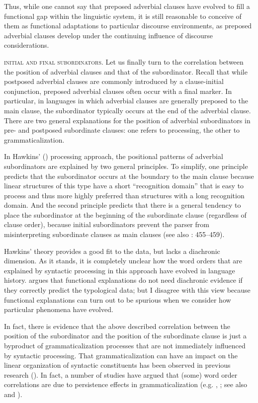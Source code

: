 \documentclass[output=paper]{langsci/langscibook}
\begin{document}
Thus, while one cannot say that preposed adverbial clauses have evolved to fill a functional gap within the linguistic system, it is still reasonable to conceive of them as functional adaptations to particular discourse environments, as preposed adverbial clauses develop under the continuing influence of discourse considerations.

\textsc{initial} \textsc{and} \textsc{final} \textsc{subordinators}. Let us finally turn to the correlation between the position of adverbial clauses and that of the subordinator. Recall that while postposed adverbial clauses are commonly introduced by a clause-initial conjunction, preposed adverbial clauses often occur with a final marker. In particular, in languages in which adverbial clauses are generally preposed to the main clause, the subordinator typically occurs at the end of the adverbial clause. There are two general explanations for the position of adverbial subordinators in pre- and postposed subordinate clauses: one refers to processing, the other to grammaticalization.

In Hawkins’ (\citeyear{Hawkins1994,Hawkins2004}) processing approach, the positional patterns of adverbial subordinators are explained by two general principles. To simplify, one principle predicts that the subordinator occurs at the boundary to the main clause because linear structures of this type have a short “recognition domain” that is easy to process and thus more highly preferred than structures with a long recognition domain. And the second principle predicts that there is a general tendency to place the subordinator at the beginning of the subordinate clause (regardless of clause order), because initial subordinators prevent the parser from misinterpreting subordinate clauses as main clauses (see also \citealt{Diessel2005}: 455--459).

Hawkins’ theory provides a good fit to the data, but lacks a diachronic dimension. As it stands, it is completely unclear how the word orders that are explained by syntactic processing in this approach have evolved in language history.  argues that functional explanations do not need diachronic evidence if they correctly predict the typological data; but I disagree with this view because functional explanations can turn out to be spurious when we consider how particular phenomena have evolved.

In fact, there is evidence that the above described correlation between the position of the subordinator and the position of the subordinate clause is just a byproduct of grammaticalization processes that are not immediately influenced by syntactic processing. That grammaticalization can have an impact on the linear organization of syntactic constituents has been observed in previous research (\citealt{Li1974_Chin}). In fact, a number of studies have argued that (some) word order correlations are due to persistence effects in grammaticalization (e.g. \citealt{Givón1975}, \citealt{Aristar1991,Bybee2010,Collins2012}; see also  and ). 
\end{document}
